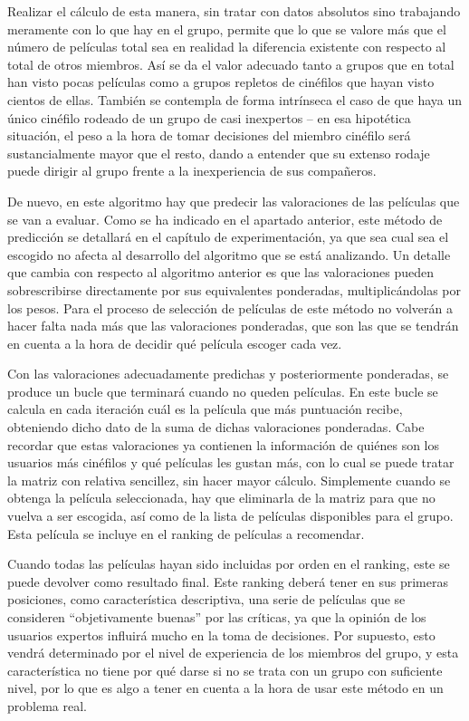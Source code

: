 Realizar el cálculo de esta manera, sin tratar con datos absolutos sino trabajando meramente con lo que hay en el grupo, permite que lo que se valore más que el número de películas total sea en realidad la diferencia existente con respecto al total de otros miembros. Así se da el valor adecuado tanto a grupos que en total han visto pocas películas como a grupos repletos de cinéfilos que hayan visto cientos de ellas. También se contempla de forma intrínseca el caso de que haya un único cinéfilo rodeado de un grupo de casi inexpertos -- en esa hipotética situación, el peso a la hora de tomar decisiones del miembro cinéfilo será sustancialmente mayor que el resto, dando a entender que su extenso rodaje puede dirigir al grupo frente a la inexperiencia de sus compañeros.

De nuevo, en este algoritmo hay que predecir las valoraciones de las películas que se van a evaluar. Como se ha indicado en el apartado anterior, este método de predicción se detallará en el capítulo de experimentación, ya que sea cual sea el escogido no afecta al desarrollo del algoritmo que se está analizando. Un detalle que cambia con respecto al algoritmo anterior es que las valoraciones pueden sobrescribirse directamente por sus equivalentes ponderadas, multiplicándolas por los pesos. Para el proceso de selección de películas de este método no volverán a hacer falta nada más que las valoraciones ponderadas, que son las que se tendrán en cuenta a la hora de decidir qué película escoger cada vez.

Con las valoraciones adecuadamente predichas y posteriormente ponderadas, se produce un bucle que terminará cuando no queden películas. En este bucle se calcula en cada iteración cuál es la película que más puntuación recibe, obteniendo dicho dato de la suma de dichas valoraciones ponderadas. Cabe recordar que estas valoraciones ya contienen la información de quiénes son los usuarios más cinéfilos y qué películas les gustan más, con lo cual se puede tratar la matriz con relativa sencillez, sin hacer mayor cálculo. Simplemente cuando se obtenga la película seleccionada, hay que eliminarla de la matriz para que no vuelva a ser escogida, así como de la lista de películas disponibles para el grupo. Esta película se incluye en el ranking de películas a recomendar.

Cuando todas las películas hayan sido incluidas por orden en el ranking, este se puede devolver como resultado final. Este ranking deberá tener en sus primeras posiciones, como característica descriptiva, una serie de películas que se consideren ``objetivamente buenas'' por las críticas, ya que la opinión de los usuarios expertos influirá mucho en la toma de decisiones. Por supuesto, esto vendrá determinado por el nivel de experiencia de los miembros del grupo, y esta característica no tiene por qué darse si no se trata con un grupo con suficiente nivel, por lo que es algo a tener en cuenta a la hora de usar este método en un problema real.